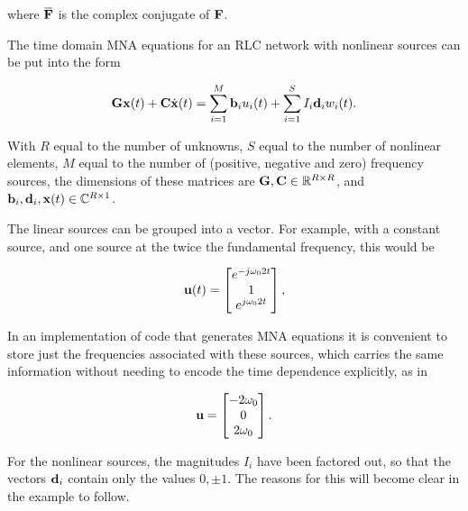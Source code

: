 where \( \overbar{\BF} \) is the complex conjugate of \( \mathbf{F} \).


The time domain MNA equations for an RLC network with nonlinear sources can be put into the form

\begin{equation}\label{eqn:ece1254projectReport:420}
\BG \Bx(t) + \BC \dot{\Bx}(t) = \sum_{i = 1}^M \Bb_i u_i(t) + \sum_{i = 1}^S I_i \Bd_i w_i(t).
\end{equation}

With \( R \) equal to the number of unknowns, \( S \) equal to the number of nonlinear elements, \( M \) equal to the number of (positive, negative and zero) frequency sources, the dimensions of these matrices are \( \mathbf{G}, \mathbf{C} \in \text{$\mathbb{R}^{R \times R}$} \), and \( \mathbf{b}_i, \mathbf{d}_i, \mathbf{x}(t) \in \text{$\mathbb{C}^{R \times 1}$} \).

The linear sources can be grouped into a vector.
For example, with a constant source, and one source at the twice the fundamental frequency, this would be

\begin{equation}\label{eqn:ece1254projectReport:440}
\Bu(t) =
\begin{bmatrix}
e^{ -j \omega_0 2 t } \\
1 \\
e^{ j \omega_0 2 t }
\end{bmatrix},
\end{equation}

In an implementation of code that generates MNA equations it is convenient to store just the frequencies associated with these sources, which carries the same information without needing to encode the time dependence explicitly, as in

\begin{equation}\label{eqn:ece1254projectReport:460}
\Bu =
\begin{bmatrix}
- 2 \omega_0 \\
0 \\
2 \omega_0
\end{bmatrix}.
\end{equation}

For the nonlinear sources, the magnitudes \( I_i \) have been factored out, so that the vectors \( \mathbf{d}_i \) contain only the values \( 0, \pm 1 \).
The reasons for this will become clear in the example to follow.


